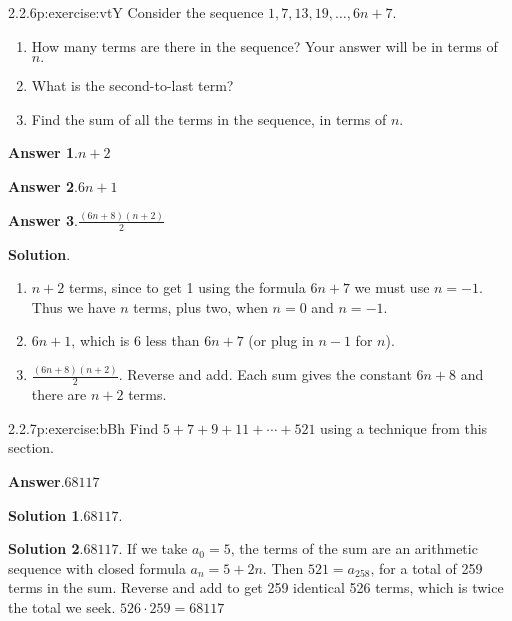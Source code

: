 \documentclass[twoside,11pt,]{book}
\newcommand{\blocktitlefont}{\relax}
\numberwithin{equation}{chapter}
\begin{document}
\begin{divisionsolution}{2.2.6}{}{p:exercise:vtY}%
Consider the sequence \(1, 7, 13, 19, \ldots, 6n + 7\text{.}\)%
\begin{enumerate}[label=(\alph*)]
\item{}How many terms are there in the sequence? Your answer will be in terms of \(n\text{.}\)%
\item{}What is the second-to-last term?%
\item{}Find the sum of all the terms in the sequence, in terms of \(n\text{.}\)%
\end{enumerate}
%
\par\smallskip%
\noindent\textbf{\blocktitlefont Answer 1}.\quad{}\(n+2\)%
\par\smallskip%
\noindent\textbf{\blocktitlefont Answer 2}.\quad{}\(6n+1\)%
\par\smallskip%
\noindent\textbf{\blocktitlefont Answer 3}.\quad{}\(\frac{\left(6n+8\right)\!\left(n+2\right)}{2}\)%
\par\smallskip%
\noindent\textbf{\blocktitlefont Solution}.\quad{}%
\begin{enumerate}[label=(\alph*)]
\item{}\(n+2\) terms, since to get 1 using the formula \(6n+7\) we must use \(n=-1\text{.}\) Thus we have \(n\) terms, plus two, when \(n=0\) and \(n=-1\text{.}\)%
\item{}\(6n+1\text{,}\) which is 6 less than \(6n+7\) (or plug in \(n-1\) for \(n\)).%
\item{}\(\frac{(6n+8)(n+2)}{2}\text{.}\) Reverse and add. Each sum gives the constant \(6n+8\) and there are \(n+2\) terms.%
\end{enumerate}
%
\end{divisionsolution}%
\begin{divisionsolution}{2.2.7}{}{p:exercise:bBh}%
Find \(5 + 7 + 9 + 11+ \cdots + 521\) using a technique from this section.%
\par\smallskip%
\noindent\textbf{\blocktitlefont Answer}.\quad{}\(68117\)%
\par\smallskip%
\noindent\textbf{\blocktitlefont Solution 1}.\quad{}\(68117\text{.}\)%
\par\smallskip%
\noindent\textbf{\blocktitlefont Solution 2}.\quad{}\(68117\text{.}\) If we take \(a_0 = 5\text{,}\) the terms of the sum are an arithmetic sequence with closed formula \(a_n = 5+2n\text{.}\) Then \(521 = a_{258}\text{,}\) for a total of 259 terms in the sum. Reverse and add to get 259 identical 526 terms, which is twice the total we seek. \(526\cdot 259 = 68117\)%
\end{divisionsolution}%
\end{document}
